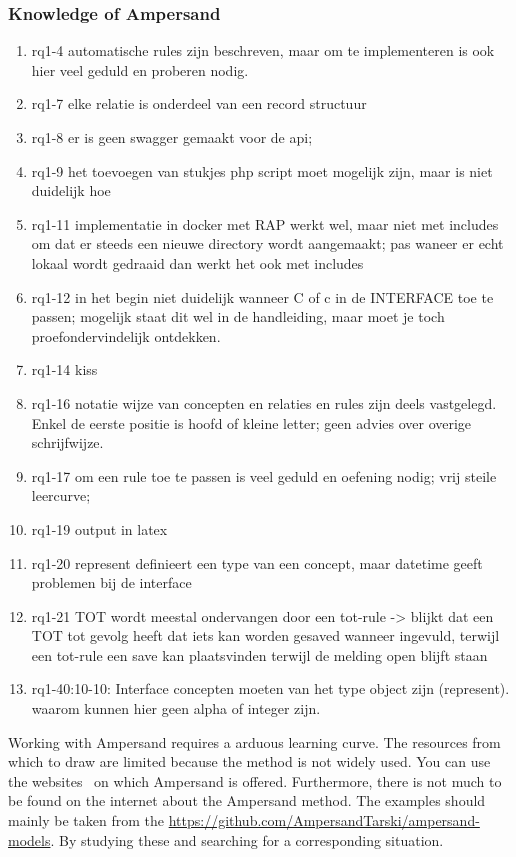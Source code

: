 \subsubsection{Knowledge of Ampersand}
\begin{comment}
plaats hier de afgehandelde items.
\end{comment}
\begin{enumerate}
    \item rq1-4 automatische rules zijn beschreven, maar om te implementeren is ook hier veel geduld en proberen nodig. 
    \item rq1-7 elke relatie is onderdeel van een record structuur
    \item rq1-8 er is geen swagger gemaakt voor de api; 
    \item rq1-9 het toevoegen van stukjes php script moet mogelijk zijn, maar is niet duidelijk hoe
    \item rq1-11 implementatie in docker met RAP werkt wel, maar niet met includes om dat er steeds een nieuwe directory wordt aangemaakt; pas waneer er echt lokaal wordt gedraaid dan werkt het ook met includes
    \item rq1-12 in het begin niet duidelijk wanneer C of c in de INTERFACE toe te passen; mogelijk staat dit wel in de handleiding, maar moet je toch proefondervindelijk ontdekken.
    \item rq1-14 kiss
    \item rq1-16 notatie wijze van concepten en relaties en rules zijn deels vastgelegd. Enkel de eerste positie is hoofd of kleine letter; geen advies over overige schrijfwijze.
    \item rq1-17 om een rule toe te passen is veel geduld en oefening nodig; vrij steile leercurve; 
    \item rq1-19 output in latex 
    \item rq1-20 represent definieert een type van een concept, maar datetime geeft problemen bij de interface
    \item rq1-21 TOT wordt meestal ondervangen door een tot-rule -> blijkt dat een TOT tot gevolg heeft dat iets kan worden gesaved wanneer ingevuld, terwijl een tot-rule een save kan plaatsvinden terwijl de melding open blijft staan
    \item rq1-40:10-10: Interface concepten moeten van het type object zijn (represent). waarom kunnen hier geen alpha of integer zijn.
\end{enumerate}

Working with Ampersand requires a arduous learning curve.
The resources from which to draw are limited because the method is not widely used.
You can use the websites~\footnotemark{} on which Ampersand is offered.
Furthermore, there is not much to be found on the internet about the Ampersand method.
The examples should mainly be taken from the \url{https://github.com/AmpersandTarski/ampersand-models}.
By studying these and searching for a corresponding situation.

